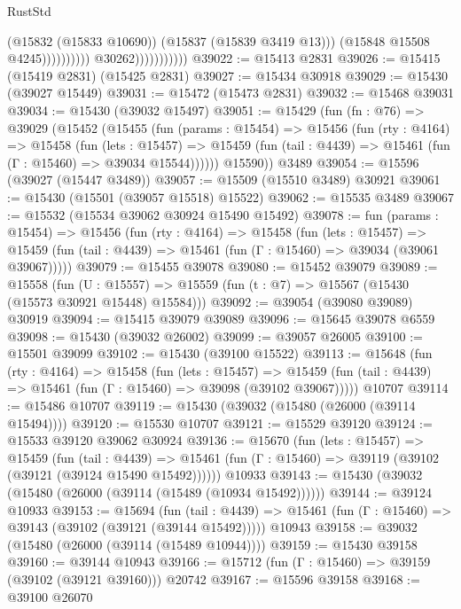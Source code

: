 \begin{lexlean}{RustStd}
\begin{coremodule}
                                              (@15832 (@15833 @10690))
                                              (@15837 (@15839 @3419 @13)))
                                            (@15848 @15508 @4245))))))))))
                          @30262)))))))))))
@39022 := @15413 @2831
@39026 := @15415 (@15419 @2831) (@15425 @2831)
@39027 := @15434 @30918
@39029 := @15430 (@39027 @15449)
@39031 := @15472 (@15473 @2831)
@39032 := @15468 @39031
@39034 := @15430 (@39032 @15497)
@39051 := @15429
    (fun (fn : @76) =>
    @39029
      (@15452
        (@15455
          (fun (params : @15454) =>
          @15456
            (fun (rty : @4164) =>
            @15458
              (fun (lets : @15457) =>
              @15459 (fun (tail : @4439) => @15461 (fun (Γ : @15460) => @39034 @15544))))))
        @15590))
    @3489
@39054 := @15596 (@39027 (@15447 @3489))
@39057 := @15509 (@15510 @3489) @30921
@39061 := @15430 (@15501 (@39057 @15518) @15522)
@39062 := @15535 @3489
@39067 := @15532 (@15534 @39062 @30924 @15490 @15492)
@39078 := fun (params : @15454) =>
  @15456
    (fun (rty : @4164) =>
    @15458
      (fun (lets : @15457) =>
      @15459 (fun (tail : @4439) => @15461 (fun (Γ : @15460) => @39034 (@39061 @39067)))))
@39079 := @15455 @39078
@39080 := @15452 @39079
@39089 := @15558
    (fun (U : @15557) => @15559 (fun (t : @7) => @15567 (@15430 (@15573 @30921 @15448) @15584)))
@39092 := @39054 (@39080 @39089) @30919
@39094 := @15415 @39079 @39089
@39096 := @15645 @39078 @6559
@39098 := @15430 (@39032 @26002)
@39099 := @39057 @26005
@39100 := @15501 @39099
@39102 := @15430 (@39100 @15522)
@39113 := @15648
    (fun (rty : @4164) =>
    @15458
      (fun (lets : @15457) =>
      @15459 (fun (tail : @4439) => @15461 (fun (Γ : @15460) => @39098 (@39102 @39067)))))
    @10707
@39114 := @15486 @10707
@39119 := @15430 (@39032 (@15480 (@26000 (@39114 @15494))))
@39120 := @15530 @10707
@39121 := @15529 @39120
@39124 := @15533 @39120 @39062 @30924
@39136 := @15670
    (fun (lets : @15457) =>
    @15459
      (fun (tail : @4439) =>
      @15461 (fun (Γ : @15460) => @39119 (@39102 (@39121 (@39124 @15490 @15492))))))
    @10933
@39143 := @15430 (@39032 (@15480 (@26000 (@39114 (@15489 (@10934 @15492))))))
@39144 := @39124 @10933
@39153 := @15694
    (fun (tail : @4439) => @15461 (fun (Γ : @15460) => @39143 (@39102 (@39121 (@39144 @15492)))))
    @10943
@39158 := @39032 (@15480 (@26000 (@39114 (@15489 @10944))))
@39159 := @15430 @39158
@39160 := @39144 @10943
@39166 := @15712 (fun (Γ : @15460) => @39159 (@39102 (@39121 @39160))) @20742
@39167 := @15596 @39158
@39168 := @39100 @26070

\end{coremodule}
\end{lexlean}
